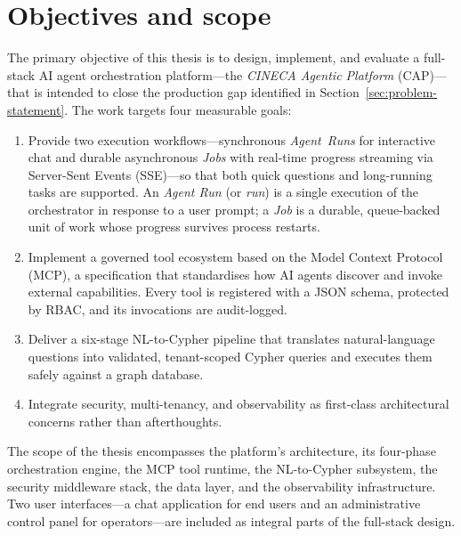 \documentclass[a4paper,noexaminfo]{sapthesis}
\begin{document}
\section{Objectives and scope}
\label{sec:objectives-scope}

The primary objective of this thesis is to design, implement, and evaluate a
full-stack AI agent orchestration platform---the \emph{CINECA Agentic
Platform} (CAP)---that is intended to close the production gap identified in
Section~\ref{sec:problem-statement}.  The work targets four measurable goals:

\begin{enumerate}
    \item Provide two execution workflows---synchronous \emph{Agent~Runs}
          for interactive chat and durable asynchronous \emph{Jobs} with
          real-time progress streaming via Server-Sent Events (SSE)---so
          that both quick questions and long-running tasks are supported.
          An \emph{Agent Run} (or \emph{run}) is a single execution of the
          orchestrator in response to a user prompt; a \emph{Job} is a
          durable, queue-backed unit of work whose progress survives
          process restarts.
    \item Implement a governed tool ecosystem based on the Model Context
          Protocol (MCP), a specification that standardises how AI agents
          discover and invoke external capabilities.  Every tool is
          registered with a JSON schema, protected by RBAC, and its
          invocations are audit-logged.
    \item Deliver a six-stage NL-to-Cypher pipeline that translates
          natural-language questions into validated, tenant-scoped Cypher
          queries and executes them safely against a graph database.
    \item Integrate security, multi-tenancy, and observability as first-class
          architectural concerns rather than afterthoughts.
\end{enumerate}

The scope of the thesis encompasses the platform's architecture, its
four-phase orchestration engine, the MCP tool runtime, the NL-to-Cypher
subsystem, the security middleware stack, the data layer, and the
observability infrastructure.  Two user interfaces---a chat application for
end users and an administrative control panel for operators---are included
as integral parts of the full-stack design.
\end{document}
